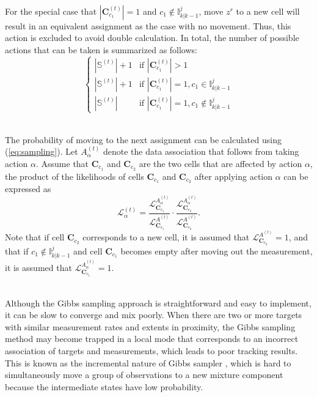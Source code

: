 ~\\
For the special case that $|\mathbf{C}_{c_1}^{(t)}|=1$ and $c_1\notin\mathbb{I}^j_{k|k-1}$, move $z^r$ to a new cell will result in an equivalent assignment as the case with no movement. Thus, this action is excluded to avoid double calculation. In total, the number of possible actions that can be taken is summarized as follows:
$$\begin{cases}
|\mathbb{S}^{(t)}|+1 & \text{if   } |\mathbf{C}_{c_1}^{(t)}|>1 \\
|\mathbb{S}^{(t)}|+1 & \text{if   } |\mathbf{C}_{c_1}^{(t)}|=1, c_1\in\mathbb{I}^j_{k|k-1} \\
|\mathbb{S}^{(t)}| & \text{if   } |\mathbf{C}_{c_1}^{(t)}|=1, c_1\notin\mathbb{I}^j_{k|k-1}
\end{cases}$$

~\\
The probability of moving to the next assignment can be calculated using (\ref{eq:sampling}). Let $A_{\alpha}^{(t)}$ denote the data association that follows from taking action $\alpha$. Assume that $\mathbf{C}_{c_1}$ and $\mathbf{C}_{c_2}$ are the two cells that are affected by action $\alpha$, the product of the likelihoods of cells $\mathbf{C}_{c_1}$ and $\mathbf{C}_{c_2}$ after applying action $\alpha$ can be expressed as
\begin{equation}
    \mathcal{L}^{(t)}_{\alpha} = \frac{\mathcal{L}^{A^{(t)}_{\alpha}}_{\mathbf{C}_{c_1}}}{\mathcal{L}^{A^{(t)}}_{\mathbf{C}_{c_1}}}\cdot\frac{\mathcal{L}^{A^{(t)}_{\alpha}}_{\mathbf{C}_{c_2}}}{\mathcal{L}^{A^{(t)}}_{\mathbf{C}_{c_2}}}.
    \label{eq:affectedlikelihood}
\end{equation}
Note that if cell $\mathbf{C}_{c_2}$ corresponds to a new cell, it is assumed that $\mathcal{L}^{A^{(t)}}_{\mathbf{C}_{c_2}} = 1$, and that if $c_1\notin\mathbb{I}^j_{k|k-1}$ and cell $\mathbf{C}_{c_1}$
becomes empty after moving out the measurement, it is assumed that $\mathcal{L}^{A^{(t)}_{\alpha}}_{\mathbf{C}_{c_1}} = 1$.

~\\
Although the Gibbs sampling approach is straightforward and easy to implement, it can be slow to converge and mix poorly. When there are two or more targets with similar measurement rates and extents in proximity, the Gibbs sampling method may become trapped in a local mode that corresponds to an incorrect association of targets and measurements, which leads to poor tracking results. This is known as the incremental nature of Gibbs sampler \cite{gibbspoor}, which is hard to simultaneously move a group of observations to a new mixture component because the intermediate states have low probability. 


